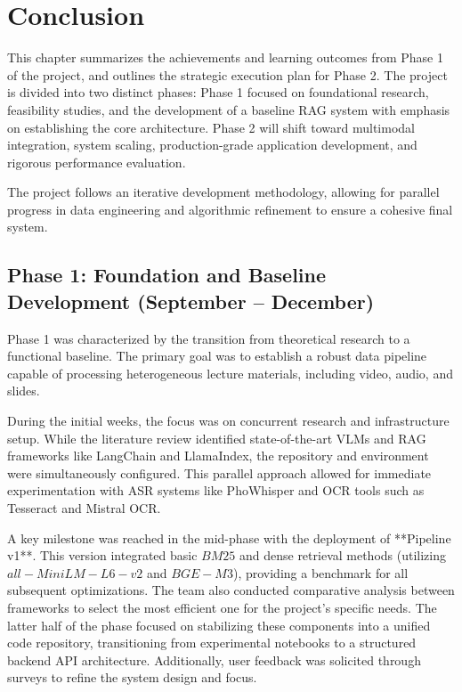 \chapter{Conclusion}

This chapter summarizes the achievements and learning outcomes from Phase 1 of the project, and outlines the strategic execution plan for Phase 2. The project is divided into two distinct phases: Phase 1 focused on foundational research, feasibility studies, and the development of a baseline RAG system with emphasis on establishing the core architecture. Phase 2 will shift toward multimodal integration, system scaling, production-grade application development, and rigorous performance evaluation. 

The project follows an iterative development methodology, allowing for parallel progress in data engineering and algorithmic refinement to ensure a cohesive final system.

\section{Phase 1: Foundation and Baseline Development (September -- December)}

Phase 1 was characterized by the transition from theoretical research to a functional baseline. The primary goal was to establish a robust data pipeline capable of processing heterogeneous lecture materials, including video, audio, and slides.

During the initial weeks, the focus was on concurrent research and infrastructure setup. While the literature review identified state-of-the-art VLMs and RAG frameworks like LangChain and LlamaIndex, the repository and environment were simultaneously configured. This parallel approach allowed for immediate experimentation with ASR systems like PhoWhisper and OCR tools such as Tesseract and Mistral OCR.

A key milestone was reached in the mid-phase with the deployment of **Pipeline v1**. This version integrated basic $BM25$ and dense retrieval methods (utilizing $all-MiniLM-L6-v2$ and $BGE-M3$), providing a benchmark for all subsequent optimizations. The team also conducted comparative analysis between frameworks to select the most efficient one for the project’s specific needs. The latter half of the phase focused on stabilizing these components into a unified code repository, transitioning from experimental notebooks to a structured backend API architecture. Additionally, user feedback was solicited through surveys to refine the system design and focus.
